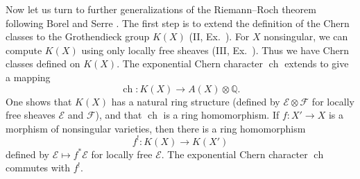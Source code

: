 {\medskip
Now let us turn to further generalizations of the Riemann--Roch theorem following Borel and Serre . The first step is to extend the definition of the Chern classes to the Grothendieck group $K(X)$ (II, Ex.~). For $X$ nonsingular, we can compute $K(X)$ using only locally free sheaves (III, Ex.~). 
Thus we have Chern classes defined on $K(X)$. The exponential Chern character $\operatorname{ch}$ extends to give a mapping
\[
\operatorname{ch}\colon K(X)\to A(X)\otimes\mathbb Q.
\]
One shows that $K(X)$ has a natural ring structure (defined by $\mathcal E\otimes\mathcal F$ for locally free sheaves $\mathcal E$ and $\mathcal F$), and that $\operatorname{ch}$ is a ring homomorphism. If $f\colon X'\to X$ is a morphism of nonsingular varieties, then there is a ring homomorphism
\[
f^!\colon K(X)\to K(X')
\]
defined by $\mathcal E\mapsto f^*\mathcal E$ for locally free $\mathcal E$. The exponential Chern character $\operatorname{ch}$ commutes with $f^!$.
}

